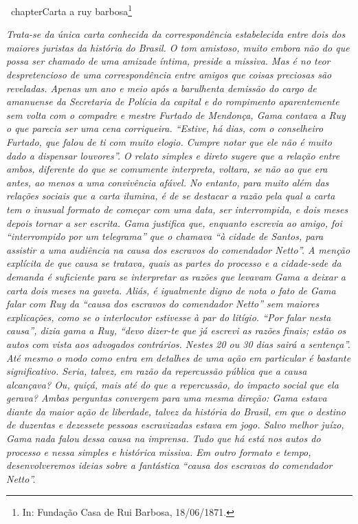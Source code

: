 {\ chapter{Carta a ruy barbosa\footnote{ In: Fundação Casa de Rui Barbosa, 18/06/1871.}}%

\begin{didascalia}
\emph{Trata-se da única carta conhecida da correspondência estabelecida
entre dois dos maiores juristas da história do Brasil. O tom amistoso,
muito embora não do que possa ser chamado de uma amizade íntima, preside
a missiva. Mas é no teor despretencioso de uma correspondência entre
amigos que coisas preciosas são reveladas. Apenas um ano e meio após a
barulhenta demissão do cargo de amanuense da Secretaria de Polícia da
capital e do rompimento aparentemente sem volta com o compadre e mestre
Furtado de Mendonça, Gama contava a Ruy o que parecia ser uma cena
corriqueira. ``Estive, há dias, com o conselheiro Furtado, que falou de
ti com muito elogio. Cumpre notar que ele não é muito dado a dispensar
louvores''. O relato simples e direto sugere que a relação entre ambos,
diferente do que se comumente interpreta, voltara, se não ao que era
antes, ao menos a uma convivência afável. No entanto, para muito além
das relações sociais que a carta ilumina, é de se destacar a razão pela
qual a carta tem o inusual formato de começar com uma data, ser
interrompida, e dois meses depois tornar a ser escrita. Gama justifica
que, enquanto escrevia ao amigo, foi ``interrompido por um telegrama'' que
o chamava ``à cidade de Santos, para assistir a uma audiência na causa
dos escravos do comendador Netto''. A menção explícita de que causa se
tratava, quais as partes do processo e a cidade-sede da demanda é
suficiente para se interpretar as razões que levavam Gama a deixar a
carta dois meses na gaveta. Aliás, é igualmente digno de nota o fato de
Gama falar com Ruy da ``causa dos escravos do comendador Netto'' sem
maiores explicações, como se o interlocutor estivesse à par do litígio.
``Por falar nesta causa'', dizia gama a Ruy, ``devo dizer-te que já escrevi
as razões finais; estão os autos com vista aos advogados contrários.
Nestes 20 ou 30 dias sairá a sentença''. Até mesmo o modo como entra em
detalhes de uma ação em particular é bastante significativo. Seria,
talvez, em razão da repercussão pública que a causa alcançava? Ou,
quiçá, mais até do que a repercussão, do impacto social que ela gerava?
Ambas perguntas convergem para uma mesma direção: Gama estava diante da
maior ação de liberdade, talvez da história do Brasil, em que o destino
de duzentas e dezessete pessoas escravizadas estava em jogo. Salvo
melhor juízo, Gama nada falou dessa causa na imprensa. Tudo que há está
nos autos do processo e nessa simples e histórica missiva. Em outro
formato e tempo, desenvolveremos ideias sobre a fantástica ``causa dos
escravos do comendador Netto''.}
\end{didascalia}

}
